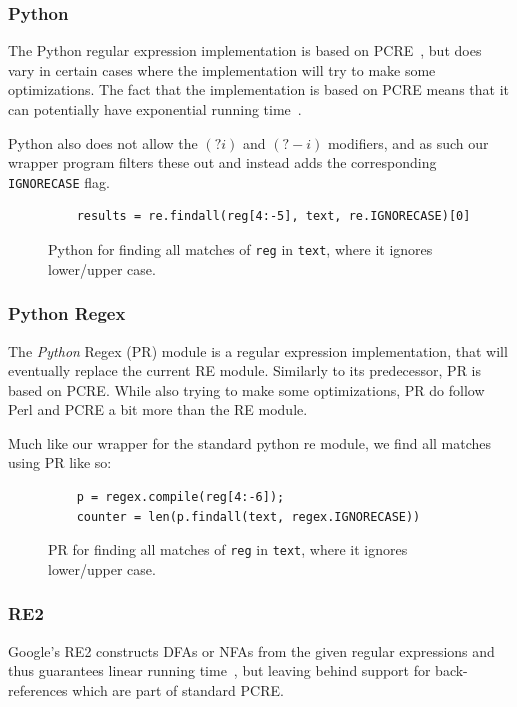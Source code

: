 \documentclass[12pt]{article}
\theoremstyle{definition}
\begin{document}
\subsubsection{Python}

The Python regular expression implementation is based on PCRE~\cite{pcre}, but does vary in certain cases where the implementation will try to make some optimizations. The fact that the implementation is based on PCRE means that it can potentially have exponential running time~\cite{pcre-running-time}.

Python also does not allow the $(?i)$ and $(?-i)$ modifiers, and as such our wrapper program filters these out and instead adds the corresponding \texttt{IGNORECASE} flag.

\begin{figure}[H]
	\begin{lstlisting}
	results = re.findall(reg[4:-5], text, re.IGNORECASE)[0]
	\end{lstlisting}
	\caption{Python for finding all matches of \texttt{reg} in \texttt{text}, where it ignores lower/upper case.}
\end{figure}


\subsubsection{Python Regex}

The \mbox{\emph{Python}} Regex (PR) module is a regular expression implementation, that will eventually replace the current RE module. Similarly to its predecessor, PR is based on PCRE. While also trying to make some optimizations, PR do follow Perl and PCRE a bit more than the RE module.

Much like our wrapper for the standard python re module, we find all matches using PR like so:
\begin{figure}[H]
	\begin{lstlisting}
	p = regex.compile(reg[4:-6]);
	counter = len(p.findall(text, regex.IGNORECASE))
	\end{lstlisting}
	\caption{PR for finding all matches of \texttt{reg} in \texttt{text}, where it ignores lower/upper case.}
\end{figure}


\subsubsection{RE2}

Google's RE2 constructs DFAs or NFAs from the given regular expressions and thus guarantees linear running time~\cite{pcre-running-time}, but leaving behind support for back-references which are part of standard PCRE.
\end{document}
